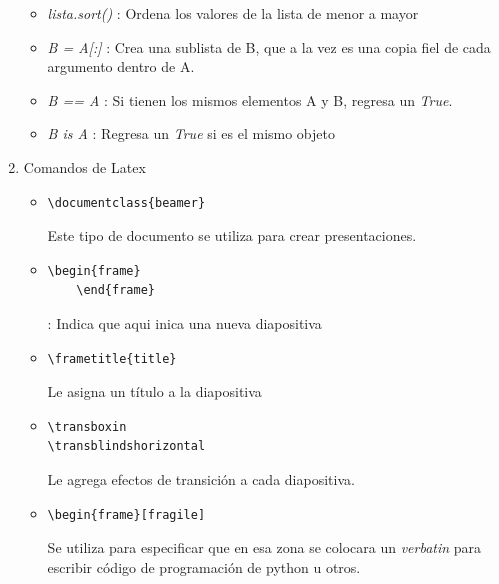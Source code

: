 \documentclass[letterpaper, 12pt,oneside]{article}
\begin{document}
\begin{enumerate}
\begin{itemize}
				\item \textit{lista.sort()} : Ordena los valores de la lista de menor a mayor
				\item \textit{B = A[:]} : Crea una sublista de B, que a la vez es una copia fiel de cada argumento dentro de A.
				\item \textit{B == A} : Si tienen los mismos elementos A y B, regresa un \textit{True}.
				\item \textit{B is A} : Regresa un \textit{True} si es el mismo objeto
				
			\end{itemize}
		
		
		\item Comandos de Latex
		\begin{itemize}
			\item \begin{lstlisting}
\documentclass{beamer}
			\end{lstlisting} Este tipo de documento se utiliza para crear presentaciones.
			\item \begin{lstlisting}
\begin{frame}
	\end{frame}
			\end{lstlisting} : Indica que aqui inica una nueva diapositiva
			\item \begin{lstlisting}
\frametitle{title}
			\end{lstlisting} Le asigna un título a la diapositiva
			\item \begin{lstlisting}
\transboxin
\transblindshorizontal
			\end{lstlisting} Le agrega efectos de transición a cada diapositiva.
			\item \begin{lstlisting}
\begin{frame}[fragile]
			\end{lstlisting} Se utiliza para especificar que en esa zona se colocara un \textit{verbatin} para escribir código de programación de python u otros.
			
			
			
		\end{itemize}
		
	\end{enumerate}
	
	
	
	
	
	
	
	
	
	
	
\end{document}
